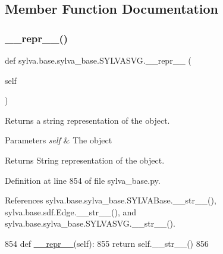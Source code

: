 \subsection{Member Function Documentation}
\mbox{\label{classsylva_1_1base_1_1sylva__base_1_1_s_y_l_v_a_s_v_g_a6f5c803748482cc149e0037405c9f130}} 
\subsubsection{\texorpdfstring{\+\_\+\+\_\+repr\+\_\+\+\_\+()}{\_\_repr\_\_()}}
{\footnotesize\ttfamily def sylva.\+base.\+sylva\+\_\+base.\+S\+Y\+L\+V\+A\+S\+V\+G.\+\_\+\+\_\+repr\+\_\+\+\_\+ (\begin{DoxyParamCaption}\item[{}]{self }\end{DoxyParamCaption})}



Returns a string representation of the object. 


\begin{DoxyParams}{Parameters}
{\em self} & The object\\
\hline
\end{DoxyParams}
\begin{DoxyReturn}{Returns}
String representation of the object. 
\end{DoxyReturn}


Definition at line 854 of file sylva\+\_\+base.\+py.



References sylva.\+base.\+sylva\+\_\+base.\+S\+Y\+L\+V\+A\+Base.\+\_\+\+\_\+str\+\_\+\+\_\+(), sylva.\+base.\+sdf.\+Edge.\+\_\+\+\_\+str\+\_\+\+\_\+(), and sylva.\+base.\+sylva\+\_\+base.\+S\+Y\+L\+V\+A\+S\+V\+G.\+\_\+\+\_\+str\+\_\+\+\_\+().


\begin{DoxyCode}
854     \textcolor{keyword}{def }\hyperlink{namespacesylva_1_1code__generation_1_1floorplanner_a84f24b1e40f5425e9bb40ab45ccbd10f}{\_\_repr\_\_}(self):
855         \textcolor{keywordflow}{return} self.\_\_str\_\_()
856 
\end{DoxyCode}
\mbox{\label{classsylva_1_1base_1_1sylva__base_1_1_s_y_l_v_a_s_v_g_a944c2c455e17e8500cb6df4fcbf1a21c}} 
